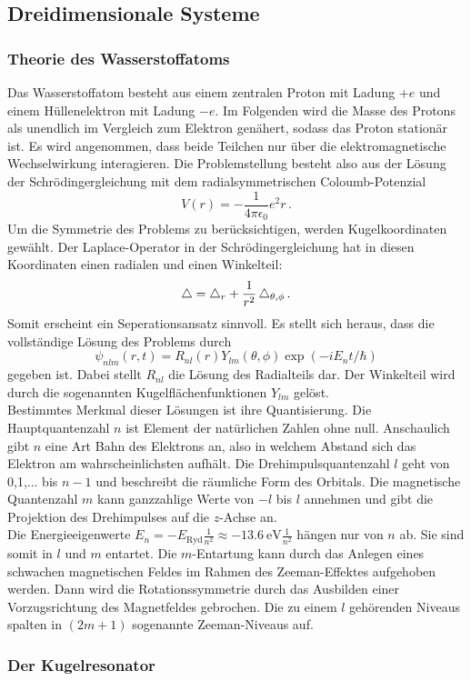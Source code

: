 \subsection{Dreidimensionale Systeme}
\label{subsec:dreidimsyst}

\subsubsection{Theorie des Wasserstoffatoms}
\label{subsubsec:hatom}
Das Wasserstoffatom besteht aus einem zentralen Proton mit Ladung $+e$ und einem Hüllenelektron mit Ladung $-e$. Im Folgenden wird die Masse des Protons als unendlich im Vergleich zum Elektron genähert, sodass das Proton stationär ist. Es wird angenommen, dass beide Teilchen nur über die elektromagnetische Wechselwirkung interagieren. Die Problemstellung besteht also aus der Lösung der Schrödingergleichung mit dem radialsymmetrischen Coloumb-Potenzial
\begin{equation}
  V(r) = - \frac{1}{4 \pi \epsilon_0}{e^2}{r}\,.
  \label{eqn:coloumb}
\end{equation}
Um die Symmetrie des Problems zu berücksichtigen, werden Kugelkoordinaten gewählt. Der Laplace-Operator in der Schrödingergleichung hat in diesen Koordinaten einen radialen und einen Winkelteil:
\begin{equation}
  \mathop{}\!\mathbin\bigtriangleup = \mathop{}\!\mathbin\bigtriangleup_r + \frac{1}{r^2} \mathop{}\!\mathbin\bigtriangleup_{\theta, \phi}\,.
  \label{eqn:laplaceWinkel}
\end{equation}
Somit erscheint ein Seperationsansatz sinnvoll. Es stellt sich heraus, dass die vollständige Lösung des Problems durch
\begin{equation}
  \psi_{nlm}(r,t) = R_{nl}(r) Y_{lm}(\theta, \phi) \exp(-i E_n t / \hbar)
  \label{eqn:hatomloesung}
\end{equation}
gegeben ist. Dabei stellt $R_{nl}$ die Lösung des Radialteils dar. Der Winkelteil wird durch die sogenannten Kugelflächenfunktionen $Y_{lm}$ gelöst.\\
Bestimmtes Merkmal dieser Lösungen ist ihre Quantisierung. Die Hauptquantenzahl $n$ ist Element der natürlichen Zahlen ohne null. Anschaulich gibt $n$ eine Art Bahn des Elektrons an, also in welchem Abstand sich das Elektron am wahrscheinlichsten aufhält. Die Drehimpulsquantenzahl $l$ geht von 0,1,... bis $n-1$ und beschreibt die räumliche Form des Orbitals. Die magnetische Quantenzahl $m$ kann ganzzahlige Werte von $-l$ bis $l$ annehmen und gibt die Projektion des Drehimpulses auf die $z$-Achse an.\\
Die Energieeigenwerte $E_n = -E_{\text{Ryd}} \frac{1}{n^2} \approx -\SI{13.6}{\electronvolt} \frac{1}{n^2}$ hängen nur von $n$ ab. Sie sind somit in $l$ und $m$ entartet. Die $m$-Entartung kann durch das Anlegen eines schwachen magnetischen Feldes im Rahmen des Zeeman-Effektes aufgehoben werden. Dann wird die Rotationssymmetrie durch das Ausbilden einer Vorzugsrichtung des Magnetfeldes gebrochen. Die zu einem $l$ gehörenden Niveaus spalten in $(2m+1)$ sogenannte Zeeman-Niveaus auf. 

\subsubsection{Der Kugelresonator}
\label{subsubsec:kugelresonator}
